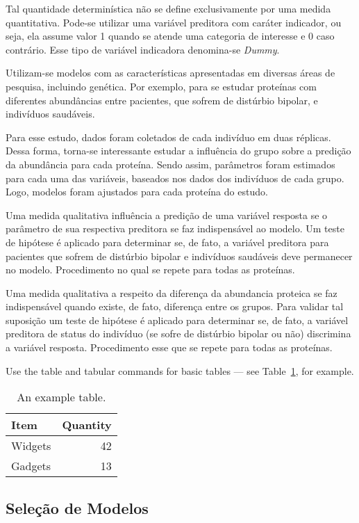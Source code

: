 \documentclass[a4paper]{article}
\begin{document}
Tal quantidade determinística não se define exclusivamente por uma medida quantitativa. Pode-se utilizar uma variável preditora com caráter indicador, ou seja, ela assume valor 1 quando se atende uma categoria de interesse e 0 caso contrário. Esse tipo de variável indicadora denomina-se \textit{Dummy}. 

Utilizam-se modelos com as características apresentadas em diversas áreas de pesquisa, incluindo genética. Por exemplo, para se estudar proteínas com diferentes abundâncias entre pacientes, que sofrem de distúrbio bipolar, e indivíduos saudáveis. 

Para esse estudo, dados foram coletados de cada indivíduo em duas réplicas. Dessa forma, torna-se interessante estudar a influência do grupo sobre a predição da abundância para cada proteína. Sendo assim, parâmetros foram estimados para cada uma das variáveis, baseados nos dados dos indivíduos de cada grupo. Logo, modelos foram ajustados para cada proteína do estudo.

Uma medida qualitativa influência a predição de uma variável resposta se o parâmetro de sua respectiva preditora se faz indispensável ao modelo. Um teste de hipótese é aplicado para determinar se, de fato, a variável preditora para pacientes que sofrem de distúrbio bipolar e indivíduos saudáveis deve permanecer no modelo. Procedimento no qual se repete para todas as proteínas.

Uma medida qualitativa a respeito da diferença da abundancia proteica se faz indispensável quando existe, de fato, diferença entre os grupos. Para validar tal suposição um teste de hipótese é aplicado para determinar se, de fato, a variável preditora de status do indivíduo (se sofre de distúrbio bipolar ou não) discrimina a variável resposta. Procedimento esse que se repete para todas as proteínas.


Use the table and tabular commands for basic tables --- see Table~\ref{tab:widgets}, for example. 

\begin{table}
\centering
\begin{tabular}{l|r}
Item & Quantity \\\hline
Widgets & 42 \\
Gadgets & 13
\end{tabular}
\caption{\label{tab:widgets}An example table.}
\end{table}

\subsection{Seleção de Modelos}
\end{document}
